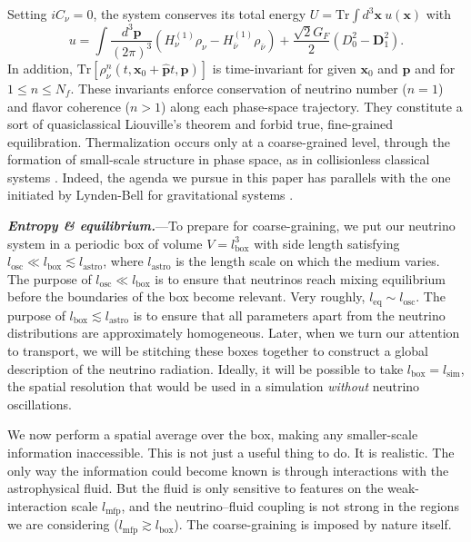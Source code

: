 \documentclass[aps,prl,twocolumn,groupedaddress]{revtex4-2}
\begin{document}
Setting $iC_\nu = 0$, the system conserves its total energy $U = \textrm{Tr} \int d^3\boldsymbol{x}~u(\boldsymbol{x})$ with
\begin{equation}
u = \int \frac{d^3 \boldsymbol{p}}{(2\pi)^3} \left( H_{\nu}^{(1)} \rho_\nu - H_{\bar{\nu}}^{(1)} \rho_{\bar{\nu}}  \right) + \frac{\sqrt{2} G_F}{2} \left( D_0^2 - \boldsymbol{D}_1^2 \right). \label{eq:uenergy}
\end{equation}
In addition, $\textrm{Tr}[\rho^{n}_\nu (t, \boldsymbol{x}_0 + \boldsymbol{\hat{p}} t, \boldsymbol{p})]$ is time-invariant for given $\boldsymbol{x}_0$ and $\boldsymbol{p}$ and for $1 \leq n \leq N_f$. These invariants enforce conservation of neutrino number ($n = 1$) and flavor coherence ($n > 1$) along each phase-space trajectory. They constitute a sort of quasiclassical Liouville's theorem and forbid true, fine-grained equilibration. Thermalization occurs only at a coarse-grained level, through the formation of small-scale structure in phase space, as in collisionless classical systems \cite{johns2020b}. Indeed, the agenda we pursue in this paper has parallels with the one initiated by Lynden-Bell for gravitational systems \cite{lynden1967}.







\textbf{\textit{Entropy \& equilibrium.}}---To prepare for coarse-graining, we put our neutrino system in a periodic box of volume $V = l_\textrm{box}^3$ with side length satisfying $l_\textrm{osc} \ll l_\textrm{box} \lesssim l_\textrm{astro}$, where $l_\textrm{astro}$ is the length scale on which the medium varies. The purpose of $l_\textrm{osc} \ll l_\textrm{box}$ is to ensure that neutrinos reach mixing equilibrium before the boundaries of the box become relevant. Very roughly, $l_\textrm{eq} \sim l_\textrm{osc}$. The purpose of $l_\textrm{box} \lesssim l_\textrm{astro}$ is to ensure that all parameters apart from the neutrino distributions are approximately homogeneous. Later, when we turn our attention to transport, we will be stitching these boxes together to construct a global description of the neutrino radiation. Ideally, it will be possible to take $l_\textrm{box} = l_\textrm{sim}$, the spatial resolution that would be used in a simulation \textit{without} neutrino oscillations.

We now perform a spatial average over the box, making any smaller-scale information inaccessible. This is not just a useful thing to do. It is realistic. The only way the information could become known is through interactions with the astrophysical fluid. But the fluid is only sensitive to features on the weak-interaction scale $l_\textrm{mfp}$, and the neutrino--fluid coupling is not strong in the regions we are considering ($l_\textrm{mfp} \gtrsim l_\textrm{box}$). The coarse-graining is imposed by nature itself.
\end{document}
